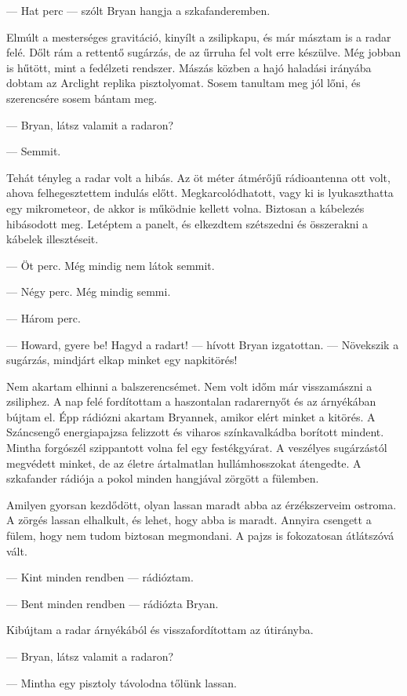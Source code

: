 \documentclass[10pt]{memoir}
\begin{document}
--- Hat perc --- szólt Bryan hangja a szkafanderemben.

Elmúlt a mesterséges gravitáció, kinyílt a zsilipkapu, és már másztam is a
radar felé. Dőlt rám a rettentő sugárzás, de az űrruha fel volt erre készülve.
Még jobban is hűtött, mint a fedélzeti rendszer. Mászás közben a hajó haladási
irányába dobtam az Arclight replika pisztolyomat. Sosem tanultam meg jól lőni,
és szerencsére sosem bántam meg.

--- Bryan, látsz valamit a radaron?

--- Semmit.

Tehát tényleg a radar volt a hibás. Az öt méter átmérőjű rádioantenna ott volt,
ahova felhegesztettem indulás előtt. Megkarcolódhatott, vagy ki is
lyukaszthatta egy mikrometeor, de akkor is működnie kellett volna. Biztosan a
kábelezés hibásodott meg. Letéptem a panelt, és elkezdtem szétszedni és
összerakni a kábelek illesztéseit.

--- Öt perc. Még mindig nem látok semmit.

--- Négy perc. Még mindig semmi.

--- Három perc.

--- Howard, gyere be! Hagyd a radart! --- hívott Bryan izgatottan. ---
Növekszik a sugárzás, mindjárt elkap minket egy napkitörés!

Nem akartam elhinni a balszerencsémet. Nem volt időm már visszamászni a
zsiliphez. A nap felé fordítottam a haszontalan radarernyőt és az árnyékában
bújtam el. Épp rádiózni akartam Bryannek, amikor elért minket a kitörés. A
Száncsengő energiapajzsa felizzott és viharos színkavalkádba borított mindent.
Mintha forgószél szippantott volna fel egy festékgyárat. A veszélyes
sugárzástól megvédett minket, de az életre ártalmatlan hullámhosszokat
átengedte. A szkafander rádiója a pokol minden hangjával zörgött a fülemben.

Amilyen gyorsan kezdődött, olyan lassan maradt abba az érzékszerveim ostroma. A
zörgés lassan elhalkult, és lehet, hogy abba is maradt. Annyira csengett a
fülem, hogy nem tudom biztosan megmondani. A pajzs is fokozatosan átlátszóvá
vált.

--- Kint minden rendben --- rádióztam.

--- Bent minden rendben --- rádiózta Bryan.

Kibújtam a radar árnyékából és visszafordítottam az útirányba. 

--- Bryan, látsz valamit a radaron?

--- Mintha egy pisztoly távolodna tőlünk lassan.
\end{document}
